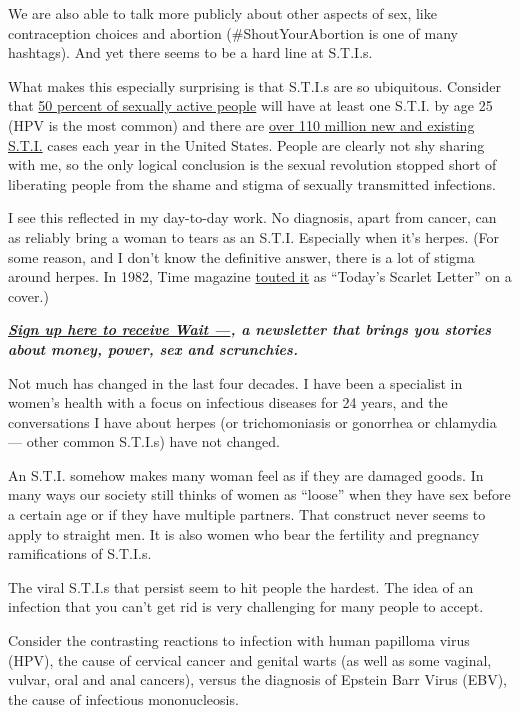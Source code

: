 We are also able to talk more publicly about other aspects of sex, like
contraception choices and abortion (\#ShoutYourAbortion is one of many
hashtags). And yet there seems to be a hard line at S.T.I.s.

What makes this especially surprising is that S.T.I.s are so ubiquitous.
Consider that
\href{http://www.ashasexualhealth.org/stdsstis/statistics/}{50 percent
of sexually active people} will have at least one S.T.I. by age 25 (HPV
is the most common) and there are
\href{https://www.cdc.gov/std/stats/sti-estimates-fact-sheet-feb-2013.pdf}{over
110 million new and existing S.T.I.} cases each year in the United
States. People are clearly not shy sharing with me, so the only logical
conclusion is the sexual revolution stopped short of liberating people
from the shame and stigma of sexually transmitted infections.

I see this reflected in my day-to-day work. No diagnosis, apart from
cancer, can as reliably bring a woman to tears as an S.T.I. Especially
when it's herpes. (For some reason, and I don't know the definitive
answer, there is a lot of stigma around herpes. In 1982, Time magazine
\href{https://www.amazon.com/Magazine-August-Todays-Scarlet-Letter/dp/B000LD6V4K}{touted
it} as ``Today's Scarlet Letter'' on a cover.)

\textbf{\href{https://www.nytimes3xbfgragh.onion/newsletters/wait}{\emph{Sign
up here to receive Wait ---}}\emph{, a newsletter that brings you
stories about money, power, sex and scrunchies.}}

Not much has changed in the last four decades. I have been a specialist
in women's health with a focus on infectious diseases for 24 years, and
the conversations I have about herpes (or trichomoniasis or gonorrhea or
chlamydia --- other common S.T.I.s) have not changed.

An S.T.I. somehow makes many woman feel as if they are damaged goods. In
many ways our society still thinks of women as ``loose'' when they have
sex before a certain age or if they have multiple partners. That
construct never seems to apply to straight men. It is also women who
bear the fertility and pregnancy ramifications of S.T.I.s.

The viral S.T.I.s that persist seem to hit people the hardest. The idea
of an infection that you can't get rid is very challenging for many
people to accept.

Consider the contrasting reactions to infection with human papilloma
virus (HPV), the cause of cervical cancer and genital warts (as well as
some vaginal, vulvar, oral and anal cancers), versus the diagnosis of
Epstein Barr Virus (EBV), the cause of infectious mononucleosis.

